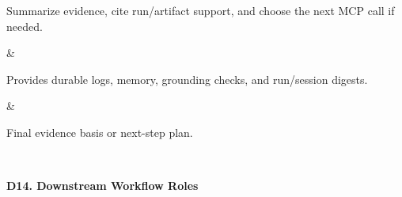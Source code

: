 {\begin{longtable}
\begin{minipage}[t]{\linewidth}
Summarize evidence, cite run/\allowbreak{}artifact support, and choose the next MCP call if needed.
\end{minipage} & \begin{minipage}[t]{\linewidth}\RaggedRight\hspace{0pt}
Provides durable logs, memory, grounding checks, and run/\allowbreak{}session digests.
\end{minipage} & \begin{minipage}[t]{\linewidth}\RaggedRight\hspace{0pt}
Final evidence basis or next-step plan.
\end{minipage} \\
\end{longtable}
}

\textbf{D14. Downstream Workflow Roles}

